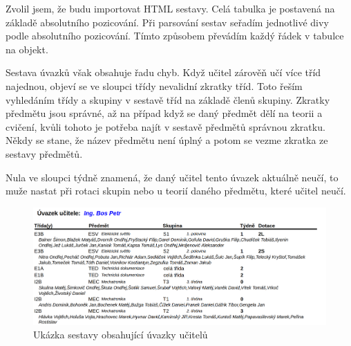 Zvolil jsem, že budu importovat HTML sestavy. Celá tabulka je postavená na základě absolutního pozicování. Při parsování sestav seřadím jednotlivé divy podle absolutního pozicování. Tímto způsobem převádím každý řádek v tabulce na objekt.

Sestava úvazků však obsahuje řadu chyb. Když učitel zárověň učí více tříd najednou, objeví se ve sloupci třídy nevalidní zkratky tříd. Toto řeším vyhledáním třídy a skupiny v sestavě tříd na základě členů skupiny. 
Zkratky předmětu jsou správné, až na případ když se daný předmět dělí na teorii a cvičení,
kvůli tohoto je potřeba najít v sestavě předmětů správnou zkratku. Někdy se stane, že název předmětu není úplný a potom se vezme zkratka ze sestavy předmětů.

Nula ve sloupci týdně znamená, že daný učitel tento úvazek aktuálně neučí, to muže nastat při rotaci skupin nebo u teorií daného předmětu, které učitel neučí. 

\begin{figure}[h]
    \centering
    \includegraphics[width=1\linewidth]{Figures/uvazky-ucitelu-ukazka.png}
    \caption{Ukázka sestavy obsahující úvazky učitelů}
    \label{fig:uvazky-ucitelu-ukazka}
\end{figure}

